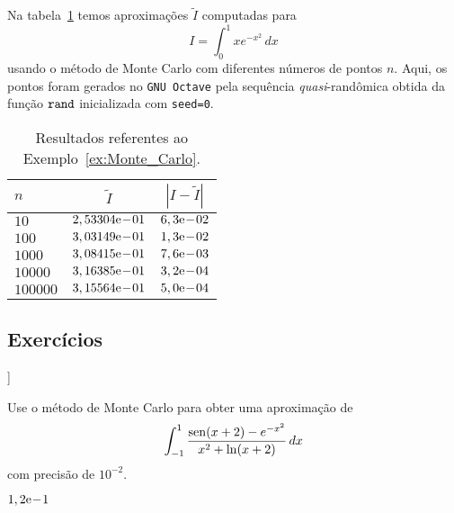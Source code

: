 \begin{ex}\label{ex:Monte_Carlo}
  Na tabela~\ref{tab:ex_Monte_Carlo} temos aproximações $\tilde{I}$ computadas para
  \begin{equation}
    I = \int_0^1 xe^{-x^2}\,dx
  \end{equation}
usando o método de Monte Carlo com diferentes números de pontos $n$. Aqui, os pontos foram gerados no \verb+GNU Octave+ pela sequência {\it quasi}-randômica obtida da função $\verb+rand+$ inicializada com \verb+seed=0+.

\begin{table}[h!]
  \centering
  \begin{tabular}{l|cc}
    $n$ & $\tilde{I}$ & $|I-\tilde{I}|$\\\hline
    $10$ & $2,53304\mathrm{e}\!-\!01$ & $6,3\mathrm{e}\!-\!02$\\
    $100$ & $3,03149\mathrm{e}\!-\!01$ & $1,3\mathrm{e}\!-\!02$ \\
    $1000$ & $3,08415\mathrm{e}\!-\!01$ & $7,6\mathrm{e}\!-\!03$ \\
    $10000$ & $3,16385\mathrm{e}\!-\!01$ & $3,2\mathrm{e}\!-\!04$ \\
    $100000$ & $3,15564\mathrm{e}\!-\!01$ & $5,0\mathrm{e}\!-\!04$ \\\hline
  \end{tabular}
  \caption{Resultados referentes ao Exemplo~\ref{ex:Monte_Carlo}.}
  \label{tab:ex_Monte_Carlo}
\end{table}

\end{ex}

\subsection*{Exercícios}

\begin{flushleft}
  [[tag:revisar]]
\end{flushleft}

\begin{exer}\label{exer:Monte_Carlo_fun1}
  Use o método de Monte Carlo para obter uma aproximação de 
  \begin{equation}
    \int_{-1}^1 \frac{\operatorname{sen}(x+2)-e^{-x^2}}{x^2+\ln(x+2)}\,dx
  \end{equation}
com precisão de $10^{-2}$.
\end{exer}
\begin{resp}
  $1,2\mathrm{e}\!-\!1$
\end{resp}
